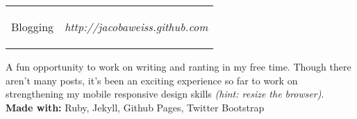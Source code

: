 \documentclass[11pt]{article}
\makeatletter
\newcommand{\headerrow}[2]
{\begin{tabular*}{\linewidth}{l@{\extracolsep{\fill}}r}
	#1 &
	#2 \\
\end{tabular*}}
\makeatother
\begin{document}
\headerrow
	{\begin{Large}Blogging\end{Large}}
	{\textit{http://jacobaweiss.github.com}}
	\begin{normalsize}
	\hspace*{1.5em}A fun opportunity to work on writing and ranting in my free time. Though there aren't many posts, it's been an exciting experience so far to work on strengthening my mobile responsive design skills {\textit{(hint: resize the browser)}}. \\
	{\bf Made with:} Ruby, Jekyll, Github Pages, Twitter Bootstrap
	\end{normalsize}
\end{document}
